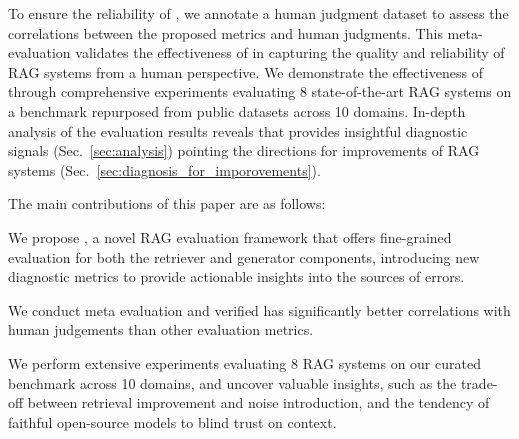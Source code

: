 To ensure the reliability of \benchname, we annotate a human judgment dataset to assess the correlations between the proposed metrics and human judgments. This meta-evaluation validates the effectiveness of \benchname\space in capturing the quality and reliability of RAG systems from a human perspective.
We demonstrate the effectiveness of \benchname\space through comprehensive experiments evaluating 8 state-of-the-art RAG systems on a benchmark repurposed from public datasets across 10 domains. In-depth analysis of the evaluation results reveals that \benchname\space provides insightful diagnostic signals (Sec.~\ref{sec:analysis}) pointing the directions for improvements of RAG systems (Sec.~\ref{sec:diagnosis_for_imporovements}). 

The main contributions of this paper are as follows:
\begin{itemize*}
\item We propose \benchname, a novel RAG evaluation framework that offers fine-grained evaluation for both the retriever and generator components, introducing new diagnostic metrics to provide actionable insights into the sources of errors.
\item We conduct meta evaluation and verified \benchname\space has significantly better correlations with human judgements than other evaluation metrics. %
\item We perform extensive experiments evaluating 8 RAG systems on our curated benchmark across 10 domains, and uncover valuable insights, such as the trade-off between retrieval improvement and noise introduction, and the tendency of faithful open-source models to blind trust on context.
\end{itemize*}